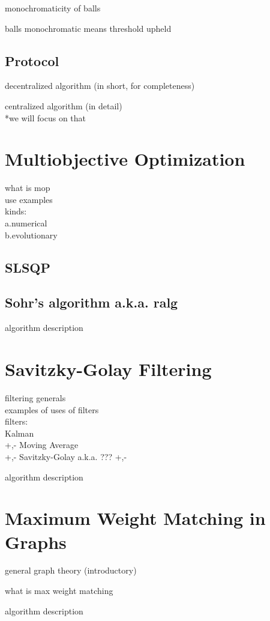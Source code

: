 monochromaticity of balls

balls monochromatic means threshold upheld


\subsection{Protocol} \label{subsec:theorBack-GM-protocol}

decentralized algorithm (in short, for completeness)

centralized algorithm (in detail)\\
*we will focus on that


\section{Multiobjective Optimization} \label{sec:theorBack-MOP}

what is mop\\
use examples\\
kinds:\\
	a.numerical\\
	b.evolutionary
\subsection{SLSQP} \label{subsec:theorBack-SLSQP}

\subsection{Sohr's algorithm a.k.a. ralg} \label{subsec:theorBack-MOP-minimax}

algorithm description

\section{Savitzky-Golay Filtering} \label{sec:theorBack-SavitzkyGolay}

filtering generals\\
examples of uses of filters\\
filters:\\
	Kalman\\
		+,-
	Moving Average\\
		+,-
	Savitzky-Golay a.k.a. ???
		+,-

algorithm description

\section{Maximum Weight Matching in Graphs} \label{sec:theorBack-MWMGraphs}

general graph theory (introductory)

what is max weight matching

algorithm description

